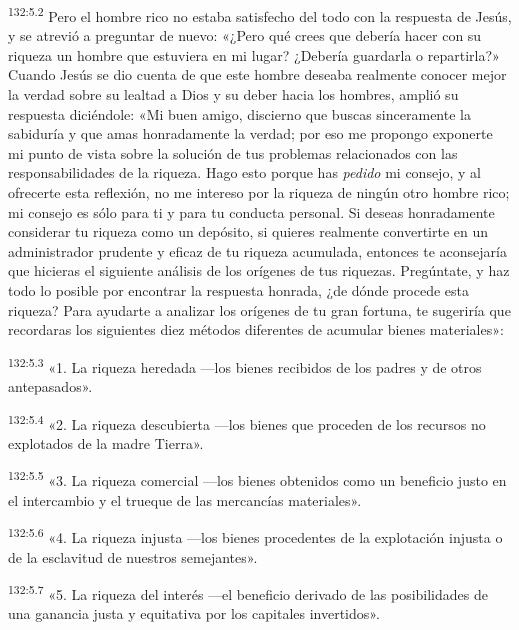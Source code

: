 \par 
\textsuperscript{132:5.2} Pero el hombre rico no estaba satisfecho del todo con la respuesta de Jesús, y se atrevió a preguntar de nuevo: «¿Pero qué crees que debería hacer con su riqueza un hombre que estuviera en mi lugar? ¿Debería guardarla o repartirla?» Cuando Jesús se dio cuenta de que este hombre deseaba realmente conocer mejor la verdad sobre su lealtad a Dios y su deber hacia los hombres, amplió su respuesta diciéndole: «Mi buen amigo, discierno que buscas sinceramente la sabiduría y que amas honradamente la verdad; por eso me propongo exponerte mi punto de vista sobre la solución de tus problemas relacionados con las responsabilidades de la riqueza. Hago esto porque has \textit{pedido} mi consejo, y al ofrecerte esta reflexión, no me intereso por la riqueza de ningún otro hombre rico; mi consejo es sólo para ti y para tu conducta personal. Si deseas honradamente considerar tu riqueza como un depósito, si quieres realmente convertirte en un administrador prudente y eficaz de tu riqueza acumulada, entonces te aconsejaría que hicieras el siguiente análisis de los orígenes de tus riquezas. Pregúntate, y haz todo lo posible por encontrar la respuesta honrada, ¿de dónde procede esta riqueza? Para ayudarte a analizar los orígenes de tu gran fortuna, te sugeriría que recordaras los siguientes diez métodos diferentes de acumular bienes materiales»:

\par 
\textsuperscript{132:5.3} «1. La riqueza heredada ---los bienes recibidos de los padres y de otros antepasados».

\par 
\textsuperscript{132:5.4} «2. La riqueza descubierta ---los bienes que proceden de los recursos no explotados de la madre Tierra».

\par 
\textsuperscript{132:5.5} «3. La riqueza comercial ---los bienes obtenidos como un beneficio justo en el intercambio y el trueque de las mercancías materiales».

\par 
\textsuperscript{132:5.6} «4. La riqueza injusta ---los bienes procedentes de la explotación injusta o de la esclavitud de nuestros semejantes».

\par 
\textsuperscript{132:5.7} «5. La riqueza del interés ---el beneficio derivado de las posibilidades de una ganancia justa y equitativa por los capitales invertidos».

